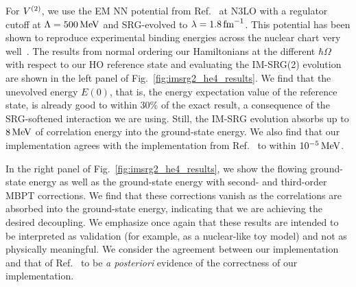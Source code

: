 For ${V}^{(2)}$, we use the EM NN potential from Ref.~\cite{Ente03n3lonn} at N3LO
with a regulator cutoff at $\Lambda=500\, \text{MeV}$ and SRG-evolved to $\lambda=1.8\, \text{fm}^{-1}$.
This potential has been shown to reproduce experimental binding energies
across the nuclear chart very well~\cite{Hebe20habi}.
The results from normal ordering our Hamiltonians at the different $\hbar \Omega$
with respect to our HO reference state
and evaluating the IM-SRG(2) evolution are shown
in the left panel of Fig.~\ref{fig:imsrg2_he4_results}.
We find that the unevolved energy $E(0)$,
that is, the energy expectation value of the reference state,
is already good to within 30\% of the exact result,
a consequence of the SRG-softened interaction we are using.
Still, the IM-SRG evolution absorbs up to $8\, \text{MeV}$ of correlation energy into the ground-state energy.
We also find that our implementation agrees with the implementation from Ref.~\cite{Stro15imsrgcpp}
to within $10^{-5}\, \text{MeV}$.

In the right panel of Fig.~\ref{fig:imsrg2_he4_results},
we show the flowing ground-state energy
as well as the ground-state energy with second- and third-order MBPT corrections.
We find that these corrections vanish as the correlations are absorbed into the ground-state energy,
indicating that we are achieving the desired decoupling.
We emphasize once again that these results are intended to be interpreted as validation
(for example, as a nuclear-like toy model)
and not as physically meaningful.
We consider the agreement between our implementation and that of Ref.~\cite{Stro15imsrgcpp}
to be \textit{a posteriori} evidence of the correctness of our implementation.

